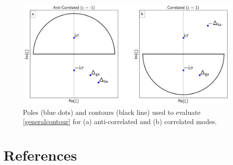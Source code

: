 \documentclass[aip, jcp, reprint, onecolumn, nofootinbib]{revtex4-2}
\begin{document}
\begin{figure}[!htbp]
	\centering
	\includegraphics[width=6.675in]{figures/corr_contour.png}
	\caption{Poles (blue dots) and contours (black line) used to evaluate \autoref{generalcontour} for (a) anti-correlated and (b) correlated modes.} 
	\label{fig:contours}
\end{figure}


\section{References}

\end{document}
